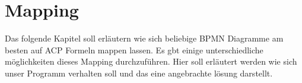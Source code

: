 
\chapter{Mapping} %

\label{Chapter3} %

Das folgende Kapitel soll erläutern wie sich beliebige BPMN Diagramme am besten auf ACP Formeln mappen lassen. Es gbt einige unterschiedliche möglichkeiten dieses Mapping durchzuführen. Hier soll erläutert werden wie sich unser Programm verhalten soll und das eine angebrachte lösung darstellt.
